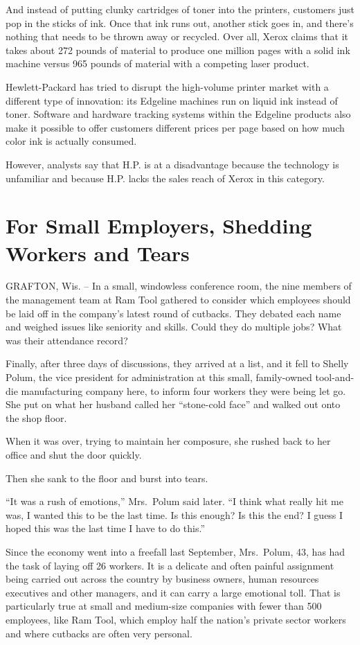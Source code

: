 \documentclass[12pt,a4paper,onecolumn]{article}
\begin{document}
And instead of putting clunky cartridges of toner into the printers, customers just pop in the
sticks of ink. Once that ink runs out, another stick goes in, and there's nothing that needs to be
thrown away or recycled. Over all, Xerox claims that it takes about 272 pounds of material to
produce one million pages with a solid ink machine versus 965 pounds of material with a competing
laser product.

Hewlett-Packard has tried to disrupt the high-volume printer market with a different type of
innovation: its Edgeline machines run on liquid ink instead of toner. Software and hardware tracking
systems within the Edgeline products also make it possible to offer customers different prices per
page based on how much color ink is actually consumed.

However, analysts say that H.P. is at a disadvantage because the technology is unfamiliar and
because H.P. lacks the sales reach of Xerox in this category.

\section{For Small Employers, Shedding Workers and Tears}

GRAFTON, Wis. -- In a small, windowless conference room, the nine members of the management team at
Ram Tool gathered to consider which employees should be laid off in the company's latest round of
cutbacks. They debated each name and weighed issues like seniority and skills. Could they do
multiple jobs? What was their attendance record?

Finally, after three days of discussions, they arrived at a list, and it fell to Shelly Polum, the
vice president for administration at this small, family-owned tool-and-die manufacturing company
here, to inform four workers they were being let go. She put on what her husband called her
``stone-cold face'' and walked out onto the shop floor.

When it was over, trying to maintain her composure, she rushed back to her office and shut the door
quickly.

Then she sank to the floor and burst into tears.

``It was a rush of emotions,'' Mrs.~Polum said later. ``I think what really hit me was, I wanted
this to be the last time. Is this enough? Is this the end? I guess I hoped this was the last time I
have to do this.''

Since the economy went into a freefall last September, Mrs.~Polum, 43, has had the task of laying
off 26 workers. It is a delicate and often painful assignment being carried out across the country
by business owners, human resources executives and other managers, and it can carry a large
emotional toll. That is particularly true at small and medium-size companies with fewer than 500
employees, like Ram Tool, which employ half the nation's private sector workers and where cutbacks
are often very personal.
\end{document}
